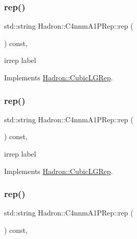 \subsubsection{\texorpdfstring{rep()}{rep()}\hspace{0.1cm}{\footnotesize\ttfamily [1/3]}}
{\footnotesize\ttfamily std\+::string Hadron\+::\+C4nnm\+A1\+P\+Rep\+::rep (\begin{DoxyParamCaption}{ }\end{DoxyParamCaption}) const\hspace{0.3cm}{\ttfamily [inline]}, {\ttfamily [virtual]}}

irrep label 

Implements \mbox{\hyperlink{structHadron_1_1CubicLGRep_a50f5ddbb8f4be4cee0106fa9e8c75e6c}{Hadron\+::\+Cubic\+L\+G\+Rep}}.

\mbox{\label{structHadron_1_1C4nnmA1PRep_a8f1a89bb3b5609a412f723569c90d508}} 
\subsubsection{\texorpdfstring{rep()}{rep()}\hspace{0.1cm}{\footnotesize\ttfamily [2/3]}}
{\footnotesize\ttfamily std\+::string Hadron\+::\+C4nnm\+A1\+P\+Rep\+::rep (\begin{DoxyParamCaption}{ }\end{DoxyParamCaption}) const\hspace{0.3cm}{\ttfamily [inline]}, {\ttfamily [virtual]}}

irrep label 

Implements \mbox{\hyperlink{structHadron_1_1CubicLGRep_a50f5ddbb8f4be4cee0106fa9e8c75e6c}{Hadron\+::\+Cubic\+L\+G\+Rep}}.

\mbox{\label{structHadron_1_1C4nnmA1PRep_a8f1a89bb3b5609a412f723569c90d508}} 
\subsubsection{\texorpdfstring{rep()}{rep()}\hspace{0.1cm}{\footnotesize\ttfamily [3/3]}}
{\footnotesize\ttfamily std\+::string Hadron\+::\+C4nnm\+A1\+P\+Rep\+::rep (\begin{DoxyParamCaption}{ }\end{DoxyParamCaption}) const\hspace{0.3cm}{\ttfamily [inline]}, {\ttfamily [virtual]}}

